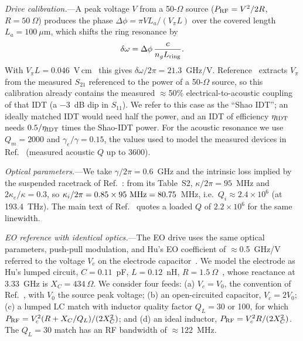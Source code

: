 \documentclass[aps,prapplied,reprint,superscriptaddress,amsmath,amssymb,floatfix]{revtex4-2}
\newcommand{\Pg}{P_{\rm RF}}
\begin{document}
\emph{Drive calibration.}---A peak voltage $V$ from a 50-$\Omega$ source ($\Pg=V^2/2R$, $R=50~\Omega$) produces the phase $\Delta\phi=\pi V L_a/(V_\pi L)$ over the covered length $L_a=100~\mu$m, which shifts the ring resonance by
\begin{equation}
\delta\omega=\Delta\phi\,\frac{c}{n_g L_{\rm ring}} .
\label{eq:cal}
\end{equation}
With $V_\pi L=0.046$~V\,cm~\cite{Shao2019} this gives $\delta\omega/2\pi=21.3$~GHz/V. Reference~\cite{Shao2019} extracts $V_\pi$ from the measured $S_{21}$ referenced to the power of a 50-$\Omega$ source, so this calibration already contains the measured $\approx$50\% electrical-to-acoustic coupling of that IDT (a $-3$~dB dip in $S_{11}$). We refer to this case as the ``Shao IDT''; an ideally matched IDT would need half the power, and an IDT of efficiency $\eta_{\rm IDT}$ needs $0.5/\eta_{\rm IDT}$ times the Shao-IDT power. For the acoustic resonance we use $Q_m=2000$ and $\gamma_e/\gamma=0.15$, the values used to model the measured devices in Ref.~\cite{Shao2019} (measured acoustic $Q$ up to 3600).

\emph{Optical parameters.}---We take $\gamma/2\pi=0.6$~GHz and the intrinsic loss implied by the suspended racetrack of Ref.~\cite{Shao2019}: from its Table~S2, $\kappa/2\pi=95$~MHz and $2\kappa_e/\kappa=0.3$, so $\kappa_i/2\pi=0.85\times95~{\rm MHz}=80.75$~MHz, i.e.\ $Q_i\approx2.4\times10^6$ (at 193.4~THz). The main text of Ref.~\cite{Shao2019} quotes a loaded $Q$ of $2.2\times10^6$ for the same linewidth.

\emph{EO reference with identical optics.}---The EO drive uses the same optical parameters, push-pull modulation, and Hu's EO coefficient of $\approx$0.5~GHz/V referred to the voltage $V_c$ on the electrode capacitor~\cite{Hu2021}. We model the electrode as Hu's lumped circuit, $C=0.11$~pF, $L=0.12$~nH, $R=1.5~\Omega$~\cite{Hu2021}, whose reactance at 3.33~GHz is $X_C=434~\Omega$. We consider four feeds: (a) $V_c=V_0$, the convention of Ref.~\cite{Hu2021}, with $V_0$ the source peak voltage; (b) an open-circuited capacitor, $V_c=2V_0$; (c) a lumped LC match with inductor quality factor $Q_L=30$ or 100, for which $\Pg=V_c^2(R+X_C/Q_L)/(2X_C^2)$; and (d) an ideal inductor, $\Pg=V_c^2R/(2X_C^2)$. The $Q_L=30$ match has an RF bandwidth of $\approx$122~MHz.

\end{document}
